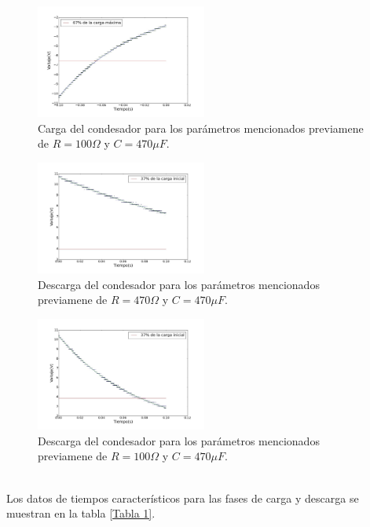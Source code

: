 \documentclass[prb,aps,twocolumn,preprintnumbers,amsmath,amssymb]{revtex4}
\begin{document}
\begin{figure}[h!]
	\centering
	\includegraphics[width=0.5\textwidth,height=0.25\textheight]{carga222}
	\caption{Carga del condesador para los parámetros mencionados previamene de $R = 100 \Omega$ y $C = 470 \mu F$.}
	\label{fig: carga222}
\end{figure}

\begin{figure}[h!]
	\centering
	\includegraphics[width=0.5\textwidth,height=0.25\textheight]{carga11}
	\caption{Descarga del condesador para los parámetros mencionados previamene de $R = 470 \Omega$ y $C = 470 \mu F$.}
	\label{fig: carga11}
\end{figure}

\begin{figure}[h!]
	\centering
	\includegraphics[width=0.5\textwidth,height=0.25\textheight]{carga22}
	\caption{Descarga del condesador para los parámetros mencionados previamene de $R = 100 \Omega$ y $C = 470 \mu F$.}
	\label{fig: carga22}
\end{figure}
\
\\
Los datos de tiempos característicos para las fases de carga y descarga se muestran en la tabla \ref{Tabla 1}.
\end{document}
